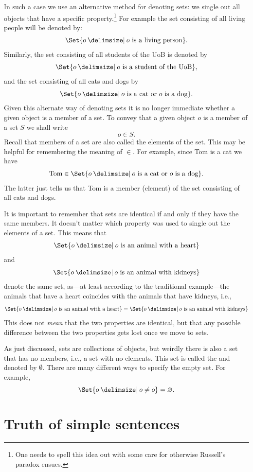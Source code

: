 In such a case we use an alternative method for denoting sets: we single out all objects that have a specific property.\footnote{One needs to spell this idea out with some care for otherwise Russell's paradox ensues.} For example the set consisting of all living people will be denoted by:
$$\Set{o \given o\text{ is a living person}}.$$
Similarly, the set consisting of all students of the UoB is denoted by
$$\Set{o \given o\text{ is a student of the UoB}},$$
and the set consisting of all cats and dogs by
$$\Set{o \given o\text{ is a cat or }o\text{ is a dog}}.$$
Given this alternate way of denoting sets it is no longer immediate whether a given object is a member of a set. To convey that a given object $o$ is a member of a set $S$ we shall write
$$o\in S.$$
Recall that members of a set are also called the elements of the set. This may be helpful for remembering the meaning of $\in$. For example, since Tom is a cat we have
$$\text{Tom}\in\Set{o \given o\text{ is a cat or }o\text{ is a dog}}.$$
The latter just tells us that Tom is a member (element) of the set consisting of all cats and dogs. 

It is important to remember that sets are identical if and only if they have the same members. It doesn't matter which property was used to single out the elements of a set. This means that 
$$\Set{o \given o\text{ is an animal with a heart}}$$
and $$\Set{o \given o\text{ is an animal with kidneys}}$$
denote the same set, as---at least according to the traditional example---the animals that have a heart coincides with the animals that have kidneys, i.e.,
$$\Set{o \given o\text{ is an animal with a heart}}=\Set{o\given o\text{ is an animal with kidneys}}$$
This does not \emph{mean} that the two properties are identical, but that any possible difference between the two properties gets lost once we move to sets.

As just discussed, sets are collections of objects, but weirdly there is also a set that has no members, i.e., a set with no elements. This set is called the  and denoted by $\emptyset$. There are many different ways to specify the empty set. For example,
$$\Set{o \given o\neq o}=\emptyset.$$




\section{Truth of simple sentences}
\label{sec:Truth FOL monadic}

